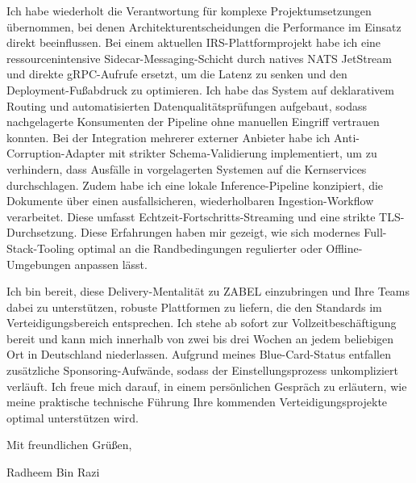 \documentclass[11pt,a4paper]{coverletter}
\begin{document}
Ich habe wiederholt die Verantwortung für komplexe Projektumsetzungen übernommen, bei denen Architekturentscheidungen die Performance im Einsatz direkt beeinflussen. Bei einem aktuellen IRS-Plattformprojekt habe ich eine ressourcenintensive Sidecar-Messaging-Schicht durch natives NATS JetStream und direkte gRPC-Aufrufe ersetzt, um die Latenz zu senken und den Deployment-Fußabdruck zu optimieren. Ich habe das System auf deklarativem Routing und automatisierten Datenqualitätsprüfungen aufgebaut, sodass nachgelagerte Konsumenten der Pipeline ohne manuellen Eingriff vertrauen konnten. Bei der Integration mehrerer externer Anbieter habe ich Anti-Corruption-Adapter mit strikter Schema-Validierung implementiert, um zu verhindern, dass Ausfälle in vorgelagerten Systemen auf die Kernservices durchschlagen. Zudem habe ich eine lokale Inference-Pipeline konzipiert, die Dokumente über einen ausfallsicheren, wiederholbaren Ingestion-Workflow verarbeitet. Diese umfasst Echtzeit-Fortschritts-Streaming und eine strikte TLS-Durchsetzung. Diese Erfahrungen haben mir gezeigt, wie sich modernes Full-Stack-Tooling optimal an die Randbedingungen regulierter oder Offline-Umgebungen anpassen lässt.

Ich bin bereit, diese Delivery-Mentalität zu ZABEL einzubringen und Ihre Teams dabei zu unterstützen, robuste Plattformen zu liefern, die den Standards im Verteidigungsbereich entsprechen. Ich stehe ab sofort zur Vollzeitbeschäftigung bereit und kann mich innerhalb von zwei bis drei Wochen an jedem beliebigen Ort in Deutschland niederlassen. Aufgrund meines Blue-Card-Status entfallen zusätzliche Sponsoring-Aufwände, sodass der Einstellungsprozess unkompliziert verläuft. Ich freue mich darauf, in einem persönlichen Gespräch zu erläutern, wie meine praktische technische Führung Ihre kommenden Verteidigungsprojekte optimal unterstützen wird.

\closing{Mit freundlichen Grüßen,}{Radheem Bin Razi}
\end{document}
